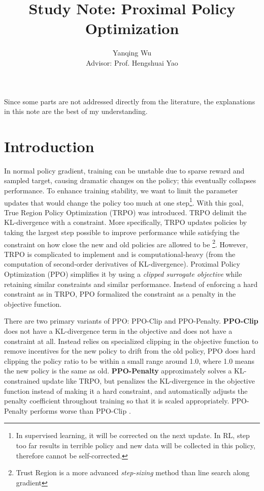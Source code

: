 \documentclass[lang=en,mode=normal,device=normal,color=blue,12pt]{elegantnote}
\title{Study Note: Proximal Policy Optimization}
\author{Yanqing Wu\\[0.5cm]{Advisor: Prof. Hengshuai Yao}}
\institute{Viwistar Robotics}
\DeclareMathOperator*{\1}{\mathbbm{1}}
\begin{document}
\maketitle

\newpage


Since some parts are not addressed directly from the literature, the explanations in this note are the best of my understanding.

\section{Introduction}

In normal policy gradient, training can be unstable due to sparse reward and sampled target, causing dramatic changes on the policy; this eventually collapses performance.
To enhance training stability, we want to limit the parameter updates that would change the policy too much at one step\footnote{In supervised learning, it will be corrected on the next update. In RL, step too far results in terrible policy and new data will be collected in this policy, therefore cannot be self-corrected.}.
With this goal, True Region Policy Optimization (TRPO) \cite{schulman2017trust} was introduced.
TRPO delimit the KL-divergence with a constraint. More specifically, TRPO updates policies by taking the largest step possible to improve performance while satisfying the constraint on how close the new and old policies are allowed to be \footnote{Trust Region is a more advanced \textit{step-sizing} method than line search along gradient}.
However, TRPO is complicated to implement and is computational-heavy (from the computation of second-order derivatives of KL-divergence). Proximal Policy Optimization (PPO) \cite{schulman2017proximal} simplifies it by using a \textit{clipped surrogate objective} while retaining similar constraints and similar performance.
Instead of enforcing a hard constraint as in TRPO, PPO formalized the constraint as a penalty in the objective function.

There are two primary variants of PPO: PPO-Clip and PPO-Penalty.
\newline
\textbf{PPO-Clip} does not have a KL-divergence term in the objective and does not have a constraint at all. Instead relies on specialized clipping in the objective function to remove incentives for the new policy to drift from the old policy, PPO does hard clipping the policy ratio to be within a small range around 1.0, where 1.0 means the new policy is the same as old.
\newline
\textbf{PPO-Penalty} approximately solves a KL-constrained update like TRPO, but penalizes the KL-divergence in the objective function instead of making it a hard constraint, and automatically adjusts the penalty coefficient throughout training so that it is scaled appropriately.
PPO-Penalty performs worse than PPO-Clip \cite{schulman2017proximal}.
\end{document}
